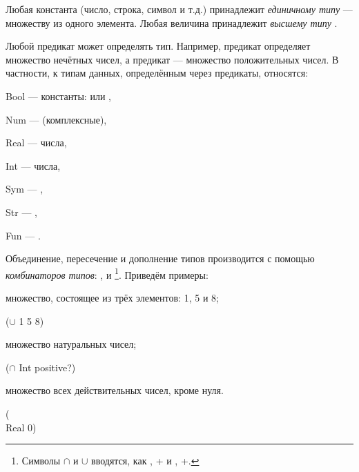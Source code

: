 Любая константа (число, строка, символ и т.д.) принадлежит \emph{единичному типу} --- множеству из одного элемента. Любая величина принадлежит \emph{высшему типу} .

Любой предикат может определять тип. Например, предикат  определяет множество нечётных чисел, а предикат  --- множество положительных чисел. В частности, к типам данных, определённым через предикаты, относятся:

\vspace{-\medskipamount}
\begin{type}
  \item Bool --- { константы:  или ,}
  \item Num --- { (комплексные),}
  \item Real --- { числа,}
  \item Int --- { числа,}
  \item Sym --- {,}
  \item Str --- {,}
  \item Fun --- {.}
\end{type}

Объединение, пересечение и дополнение типов производится с помощью \emph{комбинаторов типов}: \s{$\cup$}, \s{$\cap$} и \s{\\}\footnote{Символы $\cap$ и $\cup$ вводятся, как \s{\\cup}, +\s{\\} и \s{\\cap}, +\s{\\}.}. Приведём примеры:

\begin{example}{множество, состоящее из трёх элементов: 1, 5 и 8;}
  \begin{ExampleCode}
  ($\cup$ 1 5 8)
  \end{ExampleCode}
\end{example}
\vspace{-\bigskipamount}
\begin{example}{множество натуральных чисел;}
  \begin{ExampleCode}
  ($\cap$ Int positive?)
  \end{ExampleCode}
\end{example}
\vspace{-\bigskipamount}
\begin{example}{множество всех действительных чисел, кроме нуля.}
  \begin{ExampleCode}
  (\\ Real 0)
  \end{ExampleCode}
\end{example}

